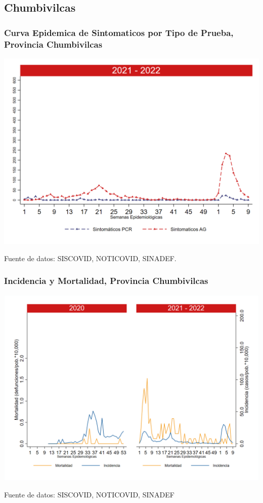 \documentclass[xcolor=table]{beamer}
\begin{document}
\subsection{Chumbivilcas}
\begin{frame}[label=Chumbivilcas]
	\frametitle{Curva Epidemica de Sintomaticos por Tipo de Prueba, Provincia Chumbivilcas}
	\vspace{-.5cm}
	\begin{center}
		\includegraphics[width=0.8\linewidth, trim={0cm .5cm 0cm 0.2cm},clip]{../figuras/sinto_prueba20_21_6.png}
	\end{center}
	{\tiny Fuente de datos: SISCOVID, NOTICOVID, SINADEF.}
	\hyperlink{TipoPrueba}{}
\end{frame}

\begin{frame}[label=Chumbivilcas]
	\frametitle{Incidencia y Mortalidad, Provincia Chumbivilcas}
	\vspace{-.5cm}
	\begin{center}
		\includegraphics[width=0.8\linewidth, trim={0cm .5cm 0cm 0.2cm},clip]{../figuras/incidencia_mortalidad_20_21_6.png}
	\end{center}
	{\tiny Fuente de datos: SISCOVID, NOTICOVID, SINADEF}
\end{frame}
\end{document}
